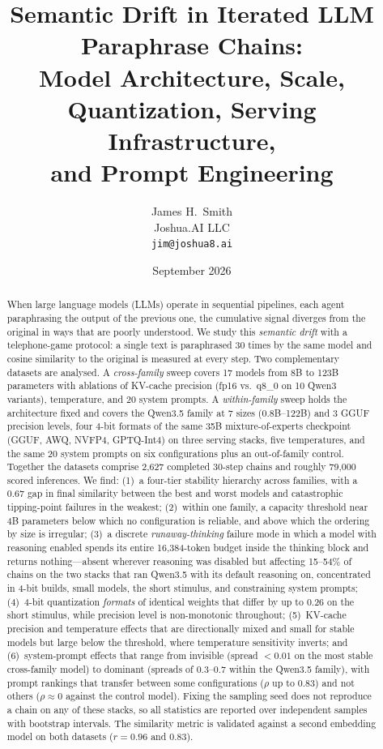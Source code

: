 \documentclass[11pt]{article}
\title{Semantic Drift in Iterated LLM Paraphrase Chains:\\
Model Architecture, Scale, Quantization, Serving Infrastructure,\\
and Prompt Engineering}
\author{
  James H.\ Smith \\
  Joshua.AI LLC \\
  \texttt{jim@joshua8.ai}
}
\date{September 2026}
\begin{document}
\maketitle

\begin{abstract}
When large language models (LLMs) operate in sequential pipelines, each agent
paraphrasing the output of the previous one, the cumulative signal diverges
from the original in ways that are poorly understood. We study this
\emph{semantic drift} with a telephone-game protocol: a single text is
paraphrased 30 times by the same model and cosine similarity to the original
is measured at every step. Two complementary datasets are analysed. A
\emph{cross-family} sweep covers 17 models from 8B to 123B parameters with
ablations of KV-cache precision (fp16 vs.\ q8\_0 on 10 Qwen3 variants),
temperature, and 20 system prompts. A \emph{within-family} sweep holds the
architecture fixed and covers the Qwen3.5 family at 7 sizes (0.8B--122B) and
3 GGUF precision levels, four 4-bit formats of the same 35B mixture-of-experts
checkpoint (GGUF, AWQ, NVFP4, GPTQ-Int4) on three serving stacks, five
temperatures, and the same 20 system prompts on six configurations plus an
out-of-family control. Together the datasets comprise 2{,}627 completed
30-step chains and roughly 79{,}000 scored inferences.
We find:
(1)~a four-tier stability hierarchy across families, with a 0.67 gap in final
similarity between the best and worst models and catastrophic tipping-point
failures in the weakest;
(2)~within one family, a capacity threshold near 4B parameters below which no
configuration is reliable, and above which the ordering by size is irregular;
(3)~a discrete \emph{runaway-thinking} failure mode in which a model with
reasoning enabled spends its entire 16{,}384-token budget inside the thinking
block and returns nothing---absent wherever reasoning was disabled but
affecting 15--54\% of chains on the two stacks that ran Qwen3.5 with its
default reasoning on, concentrated in 4-bit builds, small models, the
short stimulus, and constraining system prompts;
(4)~4-bit quantization \emph{formats} of identical weights that differ by up
to 0.26 on the short stimulus, while precision level is non-monotonic
throughout;
(5)~KV-cache precision and temperature effects that are directionally mixed
and small for stable models but large below the threshold, where
temperature sensitivity inverts; and
(6)~system-prompt effects that range from invisible (spread $<0.01$ on the
most stable cross-family model) to dominant (spreads of 0.3--0.7 within the
Qwen3.5 family), with prompt rankings that transfer between some
configurations ($\rho$ up to 0.83) and not others ($\rho\approx0$ against the
control model).
Fixing the sampling seed does not reproduce a chain on any of these stacks,
so all statistics are reported over independent samples with bootstrap
intervals. The similarity metric is validated against a second embedding
model on both datasets ($r=0.96$ and $0.83$).
\end{abstract}
\end{document}
